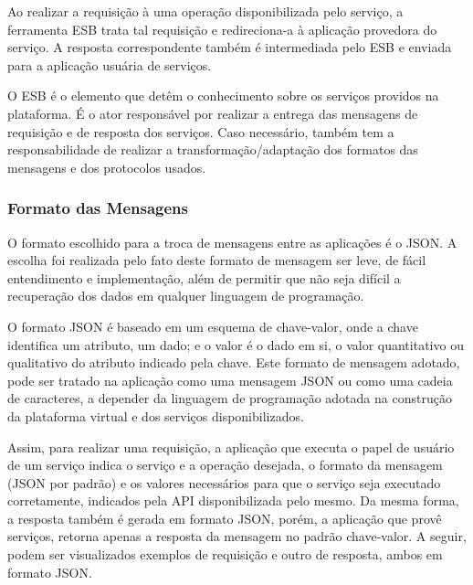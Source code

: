Ao realizar a requisição à uma operação disponibilizada pelo serviço, a ferramenta ESB trata tal requisição e redireciona-a à aplicação provedora do serviço. A resposta correspondente também é intermediada pelo ESB e enviada para a aplicação usuária de serviços.

O ESB é o elemento que detêm o conhecimento sobre os serviços providos na plataforma. É o ator responsável por realizar a entrega das mensagens de requisição e de resposta dos serviços. Caso necessário, também tem a  responsabilidade de realizar a transformação/adaptação dos formatos das mensagens e dos protocolos usados.

\subsubsection{Formato das Mensagens}
O formato escolhido para a troca de mensagens entre as aplicações é o JSON. A escolha foi realizada pelo fato deste formato de mensagem ser leve, de fácil entendimento e implementação, além de permitir que não seja difícil a recuperação dos dados em qualquer linguagem de programação.

O formato JSON é baseado em um esquema de chave-valor, onde a chave identifica um atributo, um dado; e o valor é o dado em si, o valor quantitativo ou qualitativo do atributo indicado pela chave. Este formato de mensagem adotado, pode ser tratado na aplicação como uma mensagem JSON ou como uma cadeia de caracteres, a depender da linguagem de programação adotada na construção da plataforma virtual e dos serviços disponibilizados.

Assim, para realizar uma requisição, a aplicação que executa o papel de usuário de um serviço indica o serviço e a operação desejada, o formato da mensagem (JSON por padrão) e os valores necessários para que o serviço seja executado corretamente, indicados pela API disponibilizada pelo mesmo. Da mesma forma, a resposta também é gerada em formato JSON, porém, a aplicação que provê serviços, retorna apenas a resposta da mensagem no padrão chave-valor. A seguir, podem ser visualizados exemplos de requisição e outro de resposta, ambos em formato JSON.


